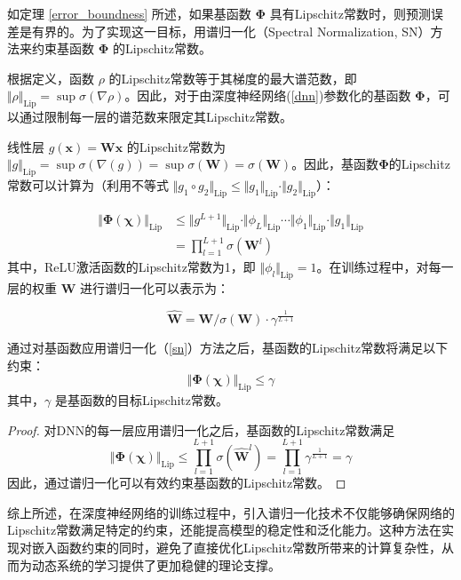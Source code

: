 \documentclass[lang=chs, degree=master, blindreview=false, winfonts=true]{yanputhesis}
\begin{document}
如定理 \ref{error_boundness} 所述，如果基函数 $\bm{\Phi}$ 具有Lipschitz常数时，则预测误差是有界的。为了实现这一目标，用谱归一化（Spectral Normalization, SN）方法来约束基函数 $\bm{\Phi}$ 的Lipschitz常数。

根据定义，函数 $\rho$ 的Lipschitz常数等于其梯度的最大谱范数，即 $\Vert \rho \Vert_{\text{Lip}} = \sup \sigma (\nabla \rho)$。因此，对于由深度神经网络(\ref{dnn})参数化的基函数 $\bm{\Phi}$，可以通过限制每一层的谱范数来限定其Lipschitz常数。

线性层 $g(\bm{x})=\bm{W}\bm{x}$ 的Lipschitz常数为 $\Vert g \Vert_{\text{Lip}} = \sup \sigma(\nabla(g))=\sup \sigma(\bm{W})=\sigma(\bm{W})$。因此，基函数$\bm{\Phi}$的Lipschitz常数可以计算为（利用不等式 $\Vert g_1 \circ g_2 \Vert_{\text{Lip}} \le \Vert g_1 \Vert_{\text{Lip}}\cdot \Vert g_2 \Vert_{\text{Lip}}$）：

\[
\begin{aligned}
	\Vert \bm{\Phi}(\bm{\chi}) \Vert_{\text{Lip}} &\le \Vert g^{L+1} \Vert_{\text{Lip}} \cdot \Vert \phi_L \Vert_{\text{Lip}} \cdots \Vert \phi_1 \Vert_{\text{Lip}} \cdot \Vert g_1 \Vert_{\text{Lip}} \\
	&= \prod_{l=1}^{L+1}\sigma(\bm{W}^l)
\end{aligned}
\]
其中，ReLU激活函数的Lipschitz常数为1，即 $\Vert \phi_l \Vert_{\text{Lip}} = 1$。在训练过程中，对每一层的权重 $\bm{W}$ 进行谱归一化可以表示为：

\[
\hat{\bm{W}} = \bm{W} / \sigma(\bm{W}) \cdot \gamma ^{\frac{1}{L+1}}  \label{sn}
\]


\begin{lemma} \label{lemma_lip}
	通过对基函数应用谱归一化（\ref{sn}）方法之后，基函数的Lipschitz常数将满足以下约束：
	\[
	\Vert \bm{\Phi}(\bm{\chi}) \Vert_{\text{Lip}}\le \gamma
	\]
	其中，$\gamma$ 是基函数的目标Lipschitz常数。
\end{lemma}

\begin{proof}
	对DNN的每一层应用谱归一化之后，基函数的Lipschitz常数满足
	\[
	\Vert \bm{\Phi}(\bm{\chi}) \Vert_{\text{Lip}} \le \prod_{l=1}^{L+1}\sigma(\hat{\bm{W}}^l) = \prod_{l=1}^{L+1}\gamma^{\frac{1}{L+1}}=\gamma
	\]
	因此，通过谱归一化可以有效约束基函数的Lipschitz常数。
\end{proof}

综上所述，在深度神经网络的训练过程中，引入谱归一化技术不仅能够确保网络的Lipschitz常数满足特定的约束，还能提高模型的稳定性和泛化能力。这种方法在实现对嵌入函数约束的同时，避免了直接优化Lipschitz常数所带来的计算复杂性，从而为动态系统的学习提供了更加稳健的理论支撑。
\end{document}
